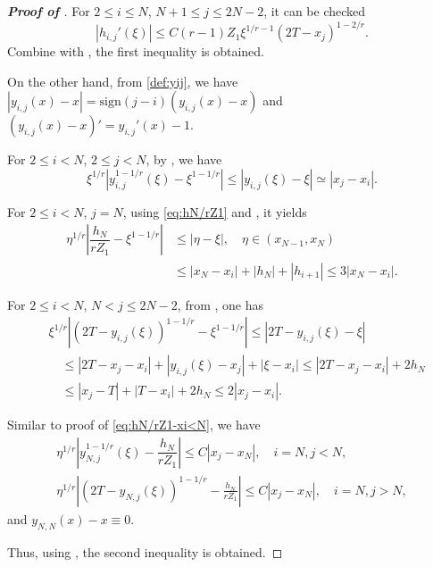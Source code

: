 \documentclass{amsart}
\theoremstyle{definition}
\theoremstyle{remark}
\numberwithin{equation}{section}
\begin{document}
\begin{proof} [\bf Proof of ]
  For $2\le i\le N$, \(N+1\le j \le 2N-2\), it can be checked 
  $$|h_{i,j}'(\xi)| \le C (r-1)Z_1 \xi^{1/r-1} (2T-x_j)^{1-2/r}.$$
  Combine with , the first inequality is obtained.

  On the other hand, from \eqref{def:yij}, we have $|y_{i,j}(x)-x| = \text{sign}(j-i) (y_{i,j}(x) - x)$ and $(y_{i,j}(x) - x)' = y_{i,j}'(x) - 1$.
  
  For \(2\le i < N\), \(2\le j<N\), by , we have
  \begin{equation*}
    \xi^{1/r} |y_{i,j}^{1-1/r}(\xi) - \xi^{1-1/r}| \le |y_{i,j}(\xi) - \xi| \simeq |x_{j}-x_{i}|  .
  \end{equation*}
  
  For \(2\le i < N\), \(j=N\), using \eqref{eq:hN/rZ1} and , it yields
  \begin{equation} \label{eq:hN/rZ1-xi<N}
    \begin{aligned}
      \eta^{1/r} |\dfrac{h_N}{r Z_1} - \xi^{1-1/r}| &\le |\eta - \xi|, \quad \eta \in (x_{N-1}, x_{N})  \\
      & \le |x_N - x_i| + |h_N| + |h_{i+1}| \le 3 |x_N - x_i|.
    \end{aligned}
  \end{equation}
  
  For \(2\le i < N\), \(N<j\le 2N-2\), from , one has
  \begin{equation*} \label{eq:2T-yij1-1/r}
    \begin{aligned}
      &\xi^{1/r} |(2T-y_{i,j}(\xi))^{1-1/r} - \xi^{1-1/r}|
              \le |2T - y_{i,j}(\xi) - \xi|  \\
      & \quad \le |2T - x_j - x_i| + |y_{i,j}(\xi) - x_j| + |\xi - x_i|
              \le |2T - x_j - x_i| + 2 h_N   \\
      & \quad \le |x_j - T| + |T-x_i| + 2h_N \le 2 |x_j - x_i|.
    \end{aligned}
  \end{equation*}

  Similar to proof of \eqref{eq:hN/rZ1-xi<N}, we have
  \begin{equation*}
  \begin{gathered}
    \eta^{1/r} |y_{N, j}^{1-1/r}(\xi) - \dfrac{h_N}{r Z_1}| \le C |x_j - x_N|, \quad i=N, j<N, \\
    \eta^{1/r} |(2T-y_{N, j}(\xi))^{1-1/r} - \frac{h_N}{r Z_1}| \le C |x_j - x_N|, \quad i=N, j>N,
  \end{gathered}
  \end{equation*}
  and \(y_{N,N}(x) - x \equiv 0\).

  Thus, using , the second inequality is obtained.
\end{proof}
\end{document}
